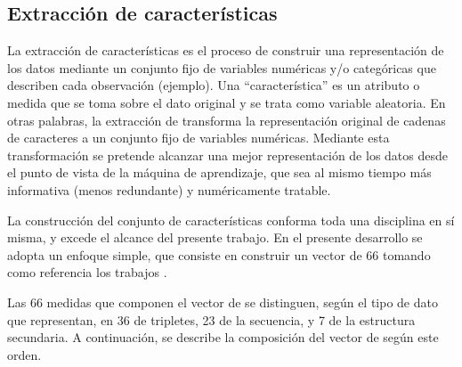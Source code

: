 %
%
\subsection{Extracción de características}
%
La extracción de características es el proceso de construir una
representación de los datos mediante un conjunto fijo de
variables numéricas y/o categóricas que describen cada
observación (ejemplo).  Una ``característica'' es un atributo o medida
que se toma sobre el dato original y se trata como variable aleatoria.
En otras palabras, la extracción de  transforma la
representación original de cadenas de caracteres a un conjunto fijo de
variables numéricas.  Mediante esta transformación se pretende
alcanzar una mejor representación de los datos desde el punto de vista
de la máquina de aprendizaje, que sea al mismo tiempo más informativa
(menos redundante) y numéricamente tratable.

La construcción del conjunto de características conforma toda una
disciplina en sí misma, y excede el alcance del presente trabajo.  En
el presente desarrollo se adopta un enfoque simple, que consiste en
construir un vector de 66  tomando como referencia los
trabajos \cite{xue,ng,batuwita}.

Las 66 medidas que componen el vector de  se distinguen,
según el tipo de dato que representan, en 36  de tripletes,
23  de la secuencia, y 7 de la estructura secundaria.  A
continuación, se describe la composición del vector de 
según este orden.
